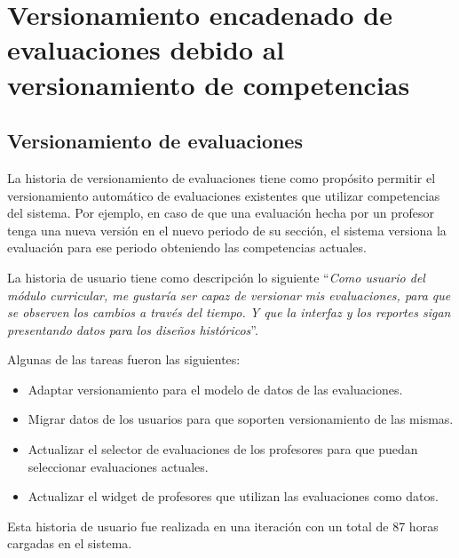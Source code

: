 \section{Versionamiento encadenado de evaluaciones debido al versionamiento de competencias}
\subsection{Versionamiento de evaluaciones}
La historia de versionamiento de evaluaciones tiene como propósito permitir el versionamiento automático de evaluaciones existentes que utilizar competencias del sistema. Por ejemplo, en caso de que una evaluación hecha por un profesor tenga una nueva versión en el nuevo periodo de su sección, el sistema versiona la evaluación para ese periodo obteniendo las competencias actuales.

La historia de usuario tiene como descripción lo siguiente \enquote{\textit{Como usuario del módulo curricular, me gustaría ser capaz de versionar mis evaluaciones, para que se observen los cambios a través del tiempo. Y que la interfaz y los reportes sigan presentando datos para los diseños históricos}}.

Algunas de las tareas fueron las siguientes:
\begin{itemize}
	\item Adaptar versionamiento para el modelo de datos de las evaluaciones.
	\item Migrar datos de los usuarios para que soporten versionamiento de las mismas.
	\item Actualizar el selector de evaluaciones de los profesores para que puedan seleccionar evaluaciones actuales.
	\item Actualizar el widget de profesores que utilizan las evaluaciones como datos.
\end{itemize}

Esta historia de usuario fue realizada en una iteración con un total de 87 horas cargadas en el sistema.
